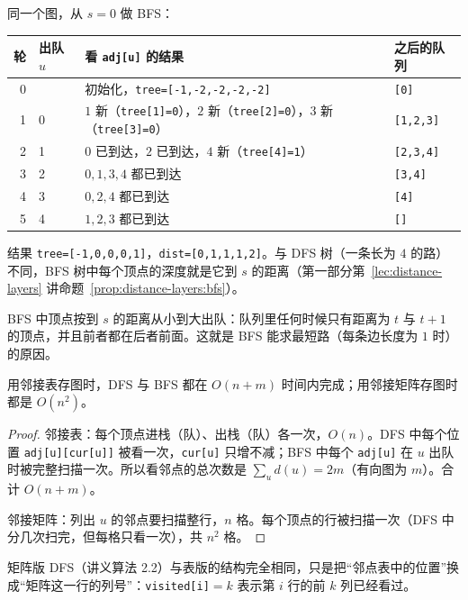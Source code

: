 \begin{example}\label{ex:traversal:bfs}
同一个图，从 $s=0$ 做 BFS：

\begin{center}
\small
\begin{tabular}{rlll}
\toprule
轮 & 出队 $u$ & 看 \texttt{adj[u]} 的结果 & 之后的队列 \\
\midrule
0 & & 初始化，\texttt{tree=[-1,-2,-2,-2,-2]} & \texttt{[0]} \\
1 & 0 & $1$ 新（\texttt{tree[1]=0}），$2$ 新（\texttt{tree[2]=0}），$3$ 新（\texttt{tree[3]=0}） & \texttt{[1,2,3]} \\
2 & 1 & $0$ 已到达，$2$ 已到达，$4$ 新（\texttt{tree[4]=1}） & \texttt{[2,3,4]} \\
3 & 2 & $0,1,3,4$ 都已到达 & \texttt{[3,4]} \\
4 & 3 & $0,2,4$ 都已到达 & \texttt{[4]} \\
5 & 4 & $1,2,3$ 都已到达 & \texttt{[]} \\
\bottomrule
\end{tabular}
\end{center}

结果 \texttt{tree=[-1,0,0,0,1]}，\texttt{dist=[0,1,1,1,2]}。与 DFS 树（一条长为 $4$ 的路）不同，BFS 树中每个顶点的深度就是它到 $s$ 的距离（第一部分第~\ref{lec:distance-layers} 讲命题~\ref{prop:distance-layers:bfs}）。
\end{example}

BFS 中顶点按到 $s$ 的距离从小到大出队：队列里任何时候只有距离为 $t$ 与 $t+1$ 的顶点，并且前者都在后者前面。这就是 BFS 能求最短路（每条边长度为 $1$ 时）的原因。


\begin{theorem}\label{thm:traversal:time}
用邻接表存图时，DFS 与 BFS 都在 $O(n+m)$ 时间内完成；用邻接矩阵存图时都是 $O(n^2)$。
\end{theorem}
\begin{proof}
邻接表：每个顶点进栈（队）、出栈（队）各一次，$O(n)$。DFS 中每个位置 \texttt{adj[u][cur[u]]} 被看一次，\texttt{cur[u]} 只增不减；BFS 中每个 \texttt{adj[u]} 在 $u$ 出队时被完整扫描一次。所以看邻点的总次数是 $\sum_ud(u)=2m$（有向图为 $m$）。合计 $O(n+m)$。

邻接矩阵：列出 $u$ 的邻点要扫描整行，$n$ 格。每个顶点的行被扫描一次（DFS 中分几次扫完，但每格只看一次），共 $n^2$ 格。
\end{proof}

矩阵版 DFS（讲义算法 2.2）与表版的结构完全相同，只是把“邻点表中的位置”换成“矩阵这一行的列号”：\texttt{visited[i]}$=k$ 表示第 $i$ 行的前 $k$ 列已经看过。

